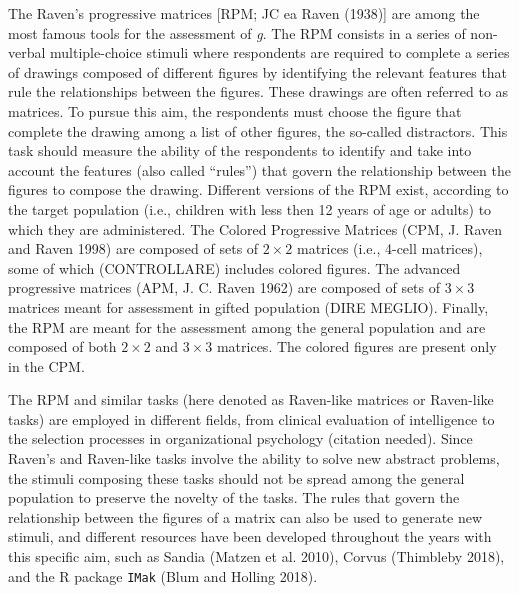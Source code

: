 \documentclass[
]{article}
\begin{document}
The Raven's progressive matrices {[}RPM; JC ea Raven (1938){]} are among
the most famous tools for the assessment of \emph{g}. The RPM consists
in a series of non-verbal multiple-choice stimuli where respondents are
required to complete a series of drawings composed of different figures
by identifying the relevant features that rule the relationships between
the figures. These drawings are often referred to as matrices. To pursue
this aim, the respondents must choose the figure that complete the
drawing among a list of other figures, the so-called distractors. This
task should measure the ability of the respondents to identify and take
into account the features (also called ``rules'') that govern the
relationship between the figures to compose the drawing. Different
versions of the RPM exist, according to the target population (i.e.,
children with less then 12 years of age or adults) to which they are
administered. The Colored Progressive Matrices (CPM, J. Raven and Raven
1998) are composed of sets of \(2\times2\) matrices (i.e., 4-cell
matrices), some of which (CONTROLLARE) includes colored figures. The
advanced progressive matrices (APM, J. C. Raven 1962) are composed of
sets of \(3\times3\) matrices meant for assessment in gifted population
(DIRE MEGLIO). Finally, the RPM are meant for the assessment among the
general population and are composed of both \(2\times2\) and
\(3\times3\) matrices. The colored figures are present only in the CPM.

The RPM and similar tasks (here denoted as Raven-like matrices or
Raven-like tasks) are employed in different fields, from clinical
evaluation of intelligence to the selection processes in organizational
psychology (citation needed). Since Raven's and Raven-like tasks involve
the ability to solve new abstract problems, the stimuli composing these
tasks should not be spread among the general population to preserve the
novelty of the tasks. The rules that govern the relationship between the
figures of a matrix can also be used to generate new stimuli, and
different resources have been developed throughout the years with this
specific aim, such as Sandia (Matzen et al. 2010), Corvus (Thimbleby
2018), and the R package \texttt{IMak} (Blum and Holling 2018).
\end{document}
